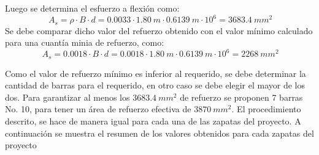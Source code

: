 \documentclass[12pt]{article}
\begin{document}
Luego se determina el esfuerzo a flexión como:
\begin{equation*}
    \ A_{s}=\rho\cdot B\cdot d=0.0033\cdot 1.80~m\cdot 0.6139~m\cdot 10^6=3683.4~mm^2
\end{equation*}
Se debe comparar dicho valor del refuerzo obtenido con el valor mínimo calculado para una cuantía minia de refuerzo, como:
\begin{equation*}
    \ A_{s}=0.0018 \cdot B\cdot d=0.0018\cdot 1.80~m\cdot 0.6139~m\cdot 10^6=2268~mm^2
\end{equation*}

Como el valor de refuerzo mínimo es inferior al requerido, se debe determinar la cantidad de barras para el requerido, en otro caso se debe elegir el mayor de los dos. Para garantizar al menos los $3683.4~mm^2$ de refuerzo se proponen 7 barras No. 10, para tener un área de refuerzo efectiva de $3870~mm^2$.
El procedimiento descrito, se hace de manera igual para cada una de las zapatas del proyecto. A continuación se muestra el resumen de los valores obtenidos para cada zapatas del proyecto
\end{document}
